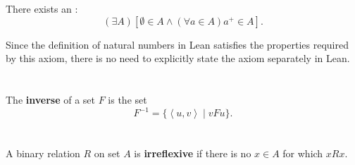 \documentclass{report}
\newcommand{\pair}[1]{\left< #1 \right>}
\begin{document}
\section{}%

There exists an :
  $$(\exists A)\left[ \emptyset \in A \land (\forall a \in A) a^+ \in A \right].$$

\begin{note}
  Since the definition of natural numbers in Lean satisfies the properties
    required by this axiom, there is no need to explicitly state the axiom
    separately in Lean.
\end{note}

\begin{axiom}

  \statementpadding



\end{axiom}

\section{}%

The \textbf{inverse} of a set $F$ is the set
  $$F^{-1} = \{\pair{u, v} \mid vFu\}.$$

\begin{definition}

  \statementpadding



\end{definition}

\section{}%

A binary relation $R$ on set $A$ is \textbf{irreflexive} if there is no $x \in A$ for which $xRx$.

\begin{definition}


\end{definition}
\end{document}

